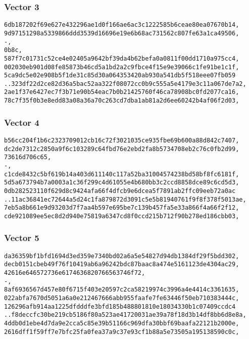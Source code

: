 \documentclass[
]{article}
\begin{document}
\hypertarget{vector-3}{%
\subsubsection{Vector 3}\label{vector-3}}

\begin{verbatim}
6db187202f69e627e432296ae1d0f166ae6ac3c1222585b6ceae80ea07670b14,
9d97151298a5339866ddd3539d16696e19e6b68ac731562c807fe63a1ca49506,
-,
0b8c,
587f7c01731c52ce4e02405a9642bf39da4b62befa0a0811f00dd1710a975cc4,
002030eb901d08fe85873b46cd5a1bd2a2c9fbce4f15e9e39066c1fe91be1c1f,
5ca9dc5e02e908b5f1de31c85d30a064353420ab930a541db5f518eee07fb059
..323df22d2ce82d36a5bac52aa322f08072cc0b9c555a5e4179e3c11a067de7a2,
2ae1f37e6427ec7f3b71e90b54eac7b0b21425760f46ca78908bc0fd2077ca16,
78c7f35f0b3e8edd83a08a36a70c263cd7dba1ab81a2d6ee60242b4af06f2d03,
\end{verbatim}

\hypertarget{vector-4}{%
\subsubsection{Vector 4}\label{vector-4}}

\begin{verbatim}
b56cc204f1b6c2323709012cb16c72f3021035ce935fbe69b600a88d842c7407,
dc2de7312c2850a9f6c103289c64fbd76e2ebd2fa8b5734708eb2c76c0fb2d99,
73616d706c65,
-,
c1cde8432c5bf619b14a403d611140c117a52ba31004574238bd58bf8fc6181f,
5d5a673794b7a0003a1c36f299c4d61055e4b680bb3c2ccd8858dce89c6cd5d3,
0db282523110f629d8c9424afa66f4dfcb9e6dcea5f7891ab2ffc09eeb72a0ac
..11ac36841ec72644a5d24c1fa879872d3091c5e5b81940761f9f8f378f5013ae,
7eb5a8b661e9d93203d7f7aa4b597e695be7c139b457fa5e33a866f4a66f2f12,
cde921089ee5ec8d2d940e75819a6347cd8f0ccd215b712f90b278ed186cbb03,
\end{verbatim}

\hypertarget{vector-5}{%
\subsubsection{Vector 5}\label{vector-5}}

\begin{verbatim}
da36359bf1bfd1694d3ed359e7340bd02a6a5e54827d94db1384df29f5bdd302,
decb0151cbeb49f76f10419ab6a96242bdc87baac8a474e5161123de4304ac29,
42616e646572736e6174636820766563746f72,
-,
8af6936567d457e80f6715f403e20597c2ca58219974c3996a4e4414c3361635,
022abfa7670d5051a6a0e212467666abb955faafe7fe63446f50eb710383444c,
126296afb914aa1225dfdddfe3bfd185b488801810e18034330b1c07409ccdc4
..f8deccfc30be219cb5186f80a523ae41720031ae39a78f18d3b14df8bb6d8e8a,
4ddb0d1ebe4d7da9e2cca5c85e39b51166c969dfa30bbf69baafa22121b2000e,
2616dff1f59ff7e7bfc25fa0fea37a9c37e93cf1b88a5e73505a195138590c0c,
\end{verbatim}
\end{document}

